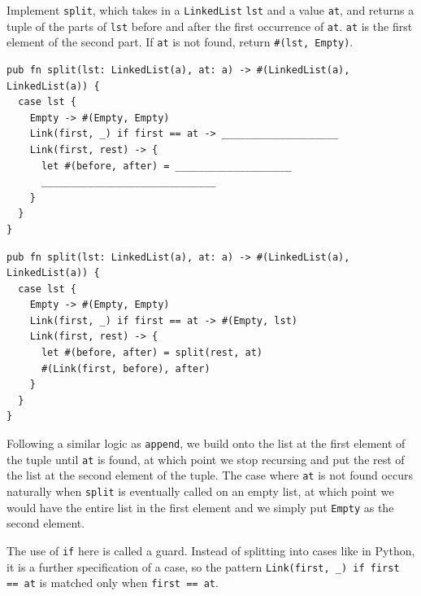 \begin{blocksection}
\question Implement \texttt{split}, which takes in a \lstinline{LinkedList} \texttt{lst} and a value \texttt{at}, and returns a tuple of the parts of \texttt{lst} before and after the first occurrence of \texttt{at}. \texttt{at} is the first element of the second part. If \texttt{at} is not found, return \lstinline{#(lst, Empty)}.
\begin{lstlisting}
pub fn split(lst: LinkedList(a), at: a) -> #(LinkedList(a), LinkedList(a)) {
  case lst {
    Empty -> #(Empty, Empty)
    Link(first, _) if first == at -> ____________________
    Link(first, rest) -> {
      let #(before, after) = ____________________
      ______________________________
    }
  }
}
\end{lstlisting}

\begin{solution}
\begin{lstlisting}
pub fn split(lst: LinkedList(a), at: a) -> #(LinkedList(a), LinkedList(a)) {
  case lst {
    Empty -> #(Empty, Empty)
    Link(first, _) if first == at -> #(Empty, lst)
    Link(first, rest) -> {
      let #(before, after) = split(rest, at)
      #(Link(first, before), after)
    }
  }
}
\end{lstlisting}
\end{solution}

\begin{questionmeta}
  Following a similar logic as \lstinline{append}, we build onto the list at the first element of the tuple until \lstinline{at} is found, at which point we stop recursing and put the rest of the list at the second element of the tuple.
  The case where \lstinline{at} is not found occurs naturally when \lstinline{split} is eventually called on an empty list, at which point we would have the entire list in the first element and we simply put \lstinline{Empty} as the second element.
  
  The use of \lstinline{if} here is called a guard. Instead of splitting into cases like in Python, it is a further specification of a case, so the pattern \lstinline{Link(first, _) if first == at} is matched only when \lstinline{first == at}.
\end{questionmeta}
\end{blocksection}